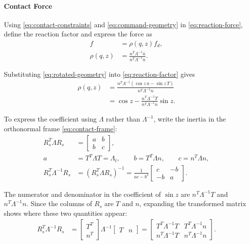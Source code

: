 \documentclass[10pt,journal,letterpaper]{IEEEtran}
\begin{document}
\paragraph{Contact Force}

Using \eqref{eq:contact-constraints} and \eqref{eq:command-geometry} in \eqref{eq:reaction-force}, define the reaction factor and express the force as
\begin{equation}\label{eq:reaction-factor}
\begin{aligned}
f&=\rho(q,z)f_d,\\
\rho(q,z)&=\frac{n^T\Lambda^{-1}\bar n}{n^T\Lambda^{-1}n}.
\end{aligned}
\end{equation}

Substituting \eqref{eq:rotated-geometry} into \eqref{eq:reaction-factor} gives
\begin{align*}
\rho(q,z)
&=\frac{n^T\Lambda^{-1}(\cos z\,n-\sin z\,T)}
{n^T\Lambda^{-1}n}\\
&=\cos z-\frac{n^T\Lambda^{-1}T}{n^T\Lambda^{-1}n}\sin z.
\end{align*}

To express the coefficient using $\Lambda$ rather than $\Lambda^{-1}$, write the inertia in the orthonormal frame \eqref{eq:contact-frame}:
\begin{align*}
R_s^T\Lambda R_s
&=\begin{bmatrix}a&b\\b&c\end{bmatrix},\\
a&=T^T\Lambda T=\Lambda_t,\qquad
b=T^T\Lambda n,\qquad c=n^T\Lambda n,\\
R_s^T\Lambda^{-1}R_s
&=(R_s^T\Lambda R_s)^{-1}
=\frac{1}{ac-b^2}
\begin{bmatrix}c&-b\\-b&a\end{bmatrix}.
\end{align*}

The numerator and denominator in the coefficient of $\sin z$ are $n^T\Lambda^{-1}T$ and $n^T\Lambda^{-1}n$. Since the columns of $R_s$ are $T$ and $n$, expanding the transformed matrix shows where these two quantities appear:
\begin{align*}
R_s^T\Lambda^{-1}R_s
&=\begin{bmatrix}T^T\\n^T\end{bmatrix}
\Lambda^{-1}
\begin{bmatrix}T&n\end{bmatrix}
=\begin{bmatrix}
T^T\Lambda^{-1}T&T^T\Lambda^{-1}n\\
n^T\Lambda^{-1}T&n^T\Lambda^{-1}n
\end{bmatrix}.
\end{align*}
\end{document}
